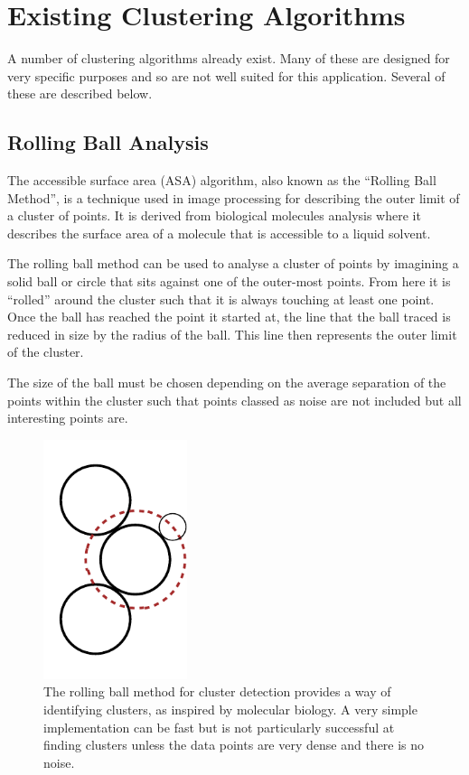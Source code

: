 
\section{Existing Clustering Algorithms}
\label{sec:existing_clustering_algorithms}

A number of clustering algorithms already exist. Many of these are designed for
very specific purposes and so are not well suited for this application. Several
of these are described below.

\subsection{Rolling Ball Analysis}
\label{sub:rolling_ball_analysis}

The accessible surface area (ASA) algorithm, also known as the ``Rolling Ball
Method'', is a technique used in image processing for describing the outer
limit of a cluster of points. It is derived from biological molecules analysis
where it describes the surface area of a molecule that is accessible to a
liquid solvent.

The rolling ball method can be used to analyse a cluster of points by imagining
a solid ball or circle that sits against one of the outer-most points. From
here it is ``rolled'' around the cluster such that it is always touching at
least one point. Once the ball has reached the point it started at, the line
that the ball traced is reduced in size by the radius of the ball. This line
then represents the outer limit of the cluster.

The size of the ball must be chosen depending on the average separation of the
points within the cluster such that points classed as noise are not included
but all interesting points are.

\begin{figure}[tbh]
	\centering
	\includegraphics[width=4.2cm]{rolling-ball.pdf}

	\caption[Rolling ball method for cluster analysis.]{The rolling ball method
		for cluster detection provides a way of identifying clusters, as
		inspired by molecular biology. A very simple implementation can be fast
		but is not particularly successful at finding clusters unless the data
		points are very dense and there is no noise.}\label{fig:rolling-ball}
\end{figure}


